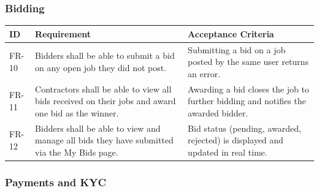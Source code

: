 \documentclass[11pt]{article}
\begin{document}
\subsubsection{Bidding}

\begin{longtable}{@{}p{1.8cm}p{5.8cm}p{5.8cm}@{}}
\toprule
\textbf{ID} & \textbf{Requirement} & \textbf{Acceptance Criteria} \\
\midrule
\endhead
FR-10 & Bidders shall be able to submit a bid on any open job they did not post. & Submitting a bid on a job posted by the same user returns an error. \\
\midrule
FR-11 & Contractors shall be able to view all bids received on their jobs and award one bid as the winner. & Awarding a bid closes the job to further bidding and notifies the awarded bidder. \\
\midrule
FR-12 & Bidders shall be able to view and manage all bids they have submitted via the My Bids page. & Bid status (pending, awarded, rejected) is displayed and updated in real time. \\
\bottomrule
\end{longtable}

\subsubsection{Payments and KYC}
\end{document}

